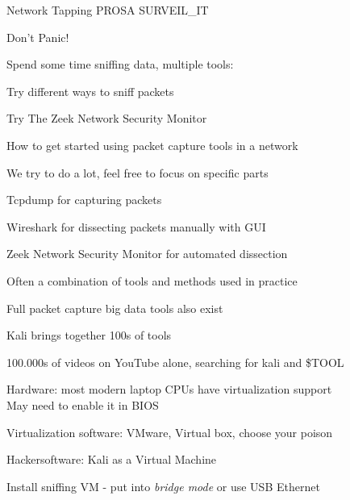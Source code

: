 \documentclass[Screen16to9,17pt]{foils}
\begin{document}
\rm


\mytitlepage
{Network Tapping }
{PROSA SURVEIL\_IT}

\LogoOn




\centerline{\color{titlecolor}\LARGE Don't Panic!}

Spend some time sniffing data, multiple tools:
\begin{list1}
\item Try different ways to sniff packets
\item Try The Zeek Network Security Monitor
\item How to get started using packet capture tools in a network
\end{list1}

\centerline{We try to do a lot, feel free to focus on specific parts}


\begin{list1}
\item Tcpdump for capturing packets
\item Wireshark for dissecting packets manually with GUI
\item Zeek Network Security Monitor for automated dissection
\end{list1}

\vskip 5mm
\centerline{Often a combination of tools and methods used in practice}

Full packet capture big data tools also exist



\begin{list1}
\item Kali  brings together 100s of tools
\item 100.000s of videos on YouTube alone, searching for kali and \$TOOL
\end{list1}




\begin{list2}
\item Hardware: most modern laptop CPUs have virtualization support \\
May need to enable it in BIOS
\item Virtualization software: VMware, Virtual box, choose your poison
\item Hackersoftware: Kali as a Virtual Machine 
\item Install sniffing VM - put into \emph{bridge mode} or use USB Ethernet
\end{list2}
\end{document}
